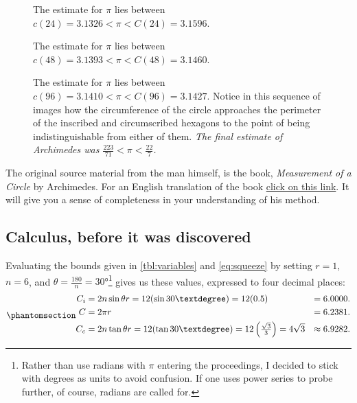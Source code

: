\documentclass[
  a4paper,
]{article}
\begin{document}
\begin{figure}
\centering

\caption{The estimate for \(\pi\) lies between
\(c(24) = 3.1326 < \pi < C(24) = 3.1596\).}\label{fig:twenty-four-gon}
\end{figure}

\begin{figure}
\centering

\caption{The estimate for \(\pi\) lies between
\(c(48) = 3.1393 < \pi < C(48) = 3.1460\).}\label{fig:forty-eight-gon}
\end{figure}

\begin{figure}
\centering

\caption{The estimate for \(\pi\) lies between
\(c(96) = 3.1410 < \pi < C(96) = 3.1427\). Notice in this sequence of
images how the circumference of the circle approaches the perimeter of
the inscribed and circumscribed hexagons to the point of being
indistinguishable from either of them. \emph{The final estimate of
Archimedes was
\(\frac{223}{71} < \pi < \frac{22}{7}\).}}\label{fig:ninety-six-gon}
\end{figure}

The original source material from the man himself, is the book,
\emph{Measurement of a Circle} by Archimedes. For an English translation
of the book \href{auxiliary/Archimedes-Circle.pdf}{click on this link}.
It will give you a sense of completeness in your understanding of his
method.

\subsection{Calculus, before it was
discovered}\label{calculus-before-it-was-discovered}

Evaluating the bounds given in \cref{tbl:variables} and
\cref{eq:squeeze} by setting \(r = 1\), \(n = 6\), and
\(\theta = \frac{180}{n} = 30°\)\footnote{Rather than use radians with
  \(\pi\) entering the proceedings, I decided to stick with degrees as
  units to avoid confusion. If one uses power series to probe further,
  of course, radians are called for.} gives us these values, expressed
to four decimal places:
\begin{equation}\phantomsection\label{eq:triple-6}{
\begin{aligned}
C_i &= 2n\sin\theta r = 12(\sin 30°) = 12(0.5) &= 6.0000.\\
C &= 2\pi r &= 6.2381.\\
C_c &= 2n\tan\theta r = 12(\tan 30°) = 12\left(\tfrac{\sqrt{3}}{3}\right) = 4\sqrt{3} &\approx 6.9282.\\
\end{aligned}
}\end{equation}
\end{document}
